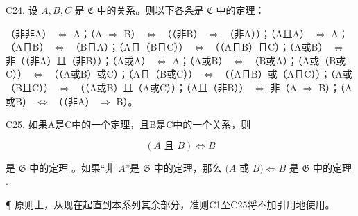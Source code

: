 C24. 设 \(A, B, C\) 是 \(\mathfrak{C}\) 中的关系。则以下各条是 \(\mathfrak{C}\) 中的定理：

（非非A） \(\Longleftrightarrow\) A；（A \(\Longrightarrow\) B） \(\Longleftrightarrow\) （（非B） \(\Longrightarrow\) （非A））；（A且A） \(\Longleftrightarrow\) A；（A且B） \(\Longleftrightarrow\) （B且A）；（A且（B且C）） \(\Longleftrightarrow\) （（A且B）且C）；（A或B） \(\Longleftrightarrow\) 非（（非A）且（非B））；（A或A） \(\Longleftrightarrow\) A；（A或B） \(\Longleftrightarrow\) （B或A）；（A或（B或C）） \(\Longleftrightarrow\) （（A或B）或C）；（A且（B或C）） \(\Longleftrightarrow\) （（A且B）或（A且C））；（A或（B且C）） \(\Longleftrightarrow\) （（A或B）且（A或C））；（A且（非B）） \(\Longleftrightarrow\) 非（A \(\Longrightarrow\) B）；（A或B） \(\Longleftrightarrow\) （（非A） \(\Longrightarrow\) B）。

C25. 如果A是C中的一个定理，且B是C中的一个关系，则

\[
(A \text {   且   } B) \Longleftrightarrow B
\]

是 \(\mathfrak{G}\) 中的定理 。如果``非 \(A\)''是 \(\mathfrak{G}\) 中的定理，那么 \((A\) 或 \(B) \Longleftrightarrow B\) 是 \(\mathfrak{G}\) 中的定理 .

¶ 原则上，从现在起直到本系列其余部分，准则C1至C25将不加引用地使用。

